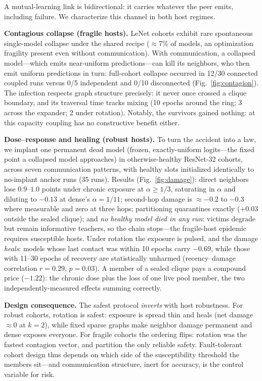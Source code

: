 \documentclass[10pt,twocolumn]{article}
\begin{document}
A mutual-learning link is bidirectional: it carries whatever the peer
emits, including failure. We characterize this channel in both host regimes.

\textbf{Contagious collapse (fragile hosts).} LeNet cohorts exhibit rare
spontaneous single-model collapse under the shared recipe ($\approx$7\% of
models, an optimization fragility present even without communication). With
communication, a collapsed model---which emits near-uniform predictions---can
kill its neighbors, who then emit uniform predictions in turn: full-cohort
collapse occurred in 12/30 connected coupled runs versus 0/5 independent and
0/10 disconnected (Fig.~\ref{fig:contagion}). The infection respects graph
structure precisely: it never once crossed a clique boundary, and its
traversal time tracks mixing (10 epochs around the ring; 3 across the
expander; 2 under rotation). Notably, the survivors gained nothing:
at this capacity coupling has no constructive benefit either.

\textbf{Dose--response and healing (robust hosts).} To turn the accident
into a law, we implant one permanent dead model (frozen, exactly-uniform
logits---the fixed point a collapsed model approaches) in otherwise-healthy
ResNet-32 cohorts, across seven communication patterns, with healthy slots
initialized identically to no-implant anchor runs (35 runs). Results
(Fig.~\ref{fig:damage}): direct neighbors lose $0.9$--$1.0$ points under
chronic exposure at $\alpha\ge 1/3$, saturating in $\alpha$ and diluting to
$-0.13$ at dense's $\alpha=1/11$; second-hop damage is $\approx-0.2$ to
$-0.3$ where measurable and zero at three hops; partitioning quarantines
exactly ($+0.03$ outside the sealed clique); and \emph{no healthy model died
in any run}: victims degrade but remain informative teachers, so the chain
stops---the fragile-host epidemic requires susceptible hosts. Under rotation
the exposure is pulsed, and the damage \emph{heals}: models whose last
contact was within 10 epochs carry $-0.69$, while those with 11--30 epochs
of recovery are statistically unharmed (recency--damage correlation
$r{=}0.29$, $p{=}0.03$). A member of a sealed clique pays a compound price
($-1.22$): the chronic dose plus the loss of one live pool member, the two
independently-measured effects summing correctly.

\textbf{Design consequence.} The safest protocol \emph{inverts} with host
robustness. For robust cohorts, rotation is safest: exposure is spread thin
and heals (net damage $\approx 0$ at $k{=}2$), while fixed sparse graphs
make neighbor damage permanent and dense exposes everyone. For fragile
cohorts the ordering flips: rotation was the fastest contagion vector, and
partition the only reliable safety. Fault-tolerant cohort design thus
depends on which side of the susceptibility threshold the members sit---and
communication structure, inert for accuracy, is the control variable for
risk.
\end{document}
